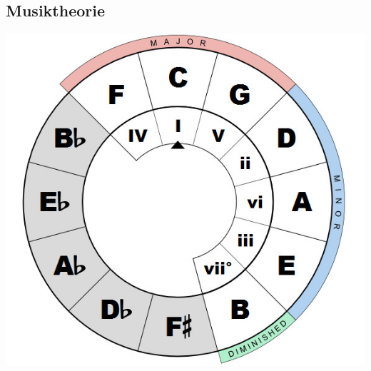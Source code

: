 \documentclass[fs, footer]{latex4ei}
\begin{document}
\begin{multicols}{4}


















\section{Musiktheorie}

\begin{center}
\includegraphics[width=0.7\columnwidth]{./img/circle-of-fifths.jpg}
\end{center}


\end{multicols}
\end{document}
